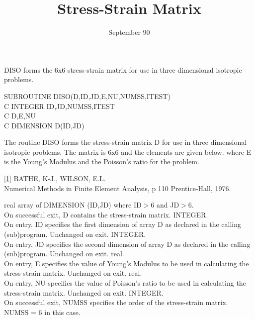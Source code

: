 \date{September 90}
\title{Stress-Strain Matrix}

\begin{purpose}
DISO forms the 6x6 stress-strain matrix for use in three
dimensional isotropic problems.
\end{purpose}
\begin{specification}
      SUBROUTINE DISO(D,ID,JD,E,NU,NUMSS,ITEST)\\
C     INTEGER ID,JD,NUMSS,ITEST\\
C     \real D,E,NU\\
C     DIMENSION D(ID,JD)
\end{specification}
\begin{description}
The routine DISO forms the stress-strain matrix D for use
in three dimensional isotropic problems. The matrix is 6x6
and the elements are given below.
where E is the Young's Modulus and  the Poisson's ratio for
the problem.
\end{description}
\begin{references}
\ref{1} BATHE, K-J., WILSON, E.L.\\
      Numerical Methods in Finite Element Analysis, p 110
      Prentice-Hall, 1976.
\end{references}
\begin{parameters}
 {{real}} array of DIMENSION (ID,JD) where ID${{>}}$6 and JD${{>}}$6.\\
      On successful exit, D contains the stress-strain matrix.
 INTEGER.\\
      On entry, ID specifies the first dimension of array D as
      declared in the calling (sub)program.
      Unchanged on exit.
 INTEGER.\\
      On entry, JD specifies the second dimension of array D as
      declared in the calling (sub)program.
      Unchanged on exit.
 {{real}}.\\
      On entry, E specifies the value of Young's Modulus to be
      used in calculating the stress-strain matrix.
      Unchanged on exit.
 {{real}}.\\
      On entry, NU specifies the value of Poisson's ratio to be
      used in calculating the stress-strain matrix.
      Unchanged on exit.
 INTEGER.\\
      On successful exit, NUMSS specifies the order of the
      stress-strain matrix. NUMSS = 6 in this case.

\end{parameters}
